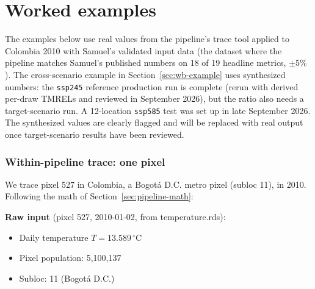\documentclass[11pt]{article}
\newcommand{\PAF}{\text{PAF}}
\newcommand{\mIHME}{m^{\text{IHME}}}
\begin{document}
\begin{center}
\end{center}

\part{Worked examples}

The examples below use real values from the pipeline's trace tool applied
to Colombia 2010 with Samuel's validated input data (the dataset where
the pipeline matches Samuel's published numbers on 18 of 19 headline
metrics, $\pm 5\%$). The cross-scenario example in
Section~\ref{sec:wb-example} uses synthesized numbers: the \texttt{ssp245}
reference production run is complete (rerun with derived per-draw TMRELs
and reviewed in September 2026), but the ratio also needs a
target-scenario run. A 12-location \texttt{ssp585} test was set up in late
September 2026. The synthesized values are clearly flagged and will be
replaced with real output once target-scenario results have been
reviewed.

\section{Within-pipeline trace: one pixel}
\label{sec:trace-one-pixel}

We trace pixel 527 in Colombia, a Bogotá D.C. metro pixel (subloc 11),
in 2010. Following the math of Section~\ref{sec:pipeline-math}:

\textbf{Raw input} (pixel 527, 2010-01-02, from temperature.rds):
\begin{itemize}[itemsep=0pt]
  \item Daily temperature $T = 13.589\,^{\circ}$C
  \item Pixel population: 5{,}100{,}137
  \item Subloc: 11 (Bogotá D.C.)
\end{itemize}
\end{document}
